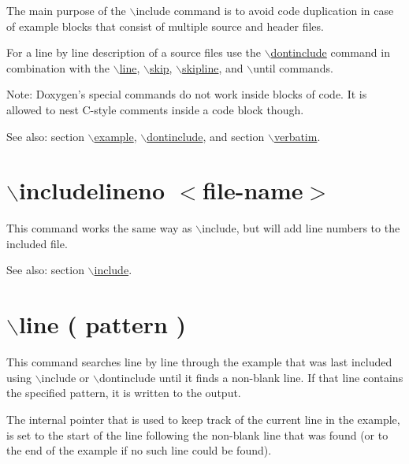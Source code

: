 The main purpose of the $\backslash$include command is to avoid code duplication in case of example blocks that consist of multiple source and header files.

For a line by line description of a source files use the \hyperlink{commands_cmddontinclude}{$\backslash$dontinclude} command in combination with the \hyperlink{commands_cmdline}{$\backslash$line}, \hyperlink{commands_cmdskip}{$\backslash$skip}, \hyperlink{commands_cmdskipline}{$\backslash$skipline}, and $\backslash$until commands.

\begin{Desc}
\item[Note:]Doxygen's special commands do not work inside blocks of code. It is allowed to nest C-style comments inside a code block though.\end{Desc}
\begin{Desc}
\item[See also:]section \hyperlink{commands_cmdexample}{$\backslash$example}, \hyperlink{commands_cmddontinclude}{$\backslash$dontinclude}, and section \hyperlink{commands_cmdverbatim}{$\backslash$verbatim}.\end{Desc}


 \hypertarget{commands_cmdincludelineno}{}\section{$\backslash$includelineno $<$file-name$>$}\label{commands_cmdincludelineno}
 This command works the same way as $\backslash$include, but will add line numbers to the included file.

\begin{Desc}
\item[See also:]section \hyperlink{commands_cmdinclude}{$\backslash$include}.\end{Desc}


 \hypertarget{commands_cmdline}{}\section{$\backslash$line ( pattern )}\label{commands_cmdline}
 This command searches line by line through the example that was last included using $\backslash$include or $\backslash$dontinclude until it finds a non-blank line. If that line contains the specified pattern, it is written to the output.

The internal pointer that is used to keep track of the current line in the example, is set to the start of the line following the non-blank line that was found (or to the end of the example if no such line could be found).

